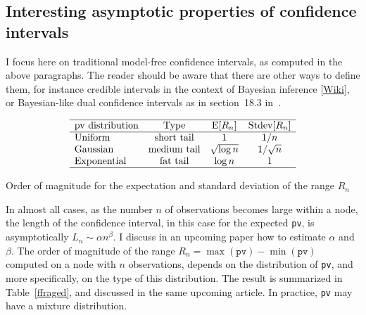 \documentclass[oneside,10pt]{book}
\renewcommand{\arraystretch}{1.4} %
\begin{document}
\subsection{Interesting asymptotic properties of confidence intervals}

I focus here on traditional model-free confidence intervals, as computed in the above paragraphs. The reader should be aware that there are other ways to define them, for instance \textcolor{index}{credible intervals} in the context of
 \textcolor{index}{Bayesian inference} [\href{https://en.wikipedia.org/wiki/Bayesian_inference}{Wiki}], or
 Bayesian-like \textcolor{index}{dual confidence intervals} as in section~18.3 in~\cite{vgelsevier}.


\renewcommand{\arraystretch}{1.2} %
\begin{center}
\begin{table}[H]
\[
\begin{array}{lccc}
\hline
\text{pv distribution} & \text{Type} &  \text{E}[R_n] & \text{Stdev}[R_n] \\
\hline
\text{Uniform} & \text{short tail} & 1 & 1/n \\
\text{Gaussian} & \text{medium tail} & \sqrt{\log n} & 1/\sqrt{n} \\
\text{Exponential} & \text{fat tail} & \log n & 1\\
\hline
\end{array}
\]
\caption{\label{ffraged}Order of magnitude for the expectation and standard deviation of the range $R_n$}
\end{table}
\end{center}

\renewcommand{\arraystretch}{1.0} %

In almost all cases, as the number $n$ of observations becomes large within a node, the length of the confidence interval, in this case for the expected \texttt{pv}, is asymptotically
 $L_n\sim\alpha n^\beta$. I discuss in an upcoming paper how to estimate $\alpha$ and $\beta$. The order of magnitude of the range $R_n =\max(\texttt{pv}) - \min(\texttt{pv})$
  computed on a node with $n$ observations, depends on the distribution of \texttt{pv}, and more specifically, on the type of this distribution. The result is summarized in Table~\ref{ffraged}, and discussed in the same upcoming article. In practice, \texttt{pv} may have a \textcolor{index}{mixture  distribution}.
\end{document}
